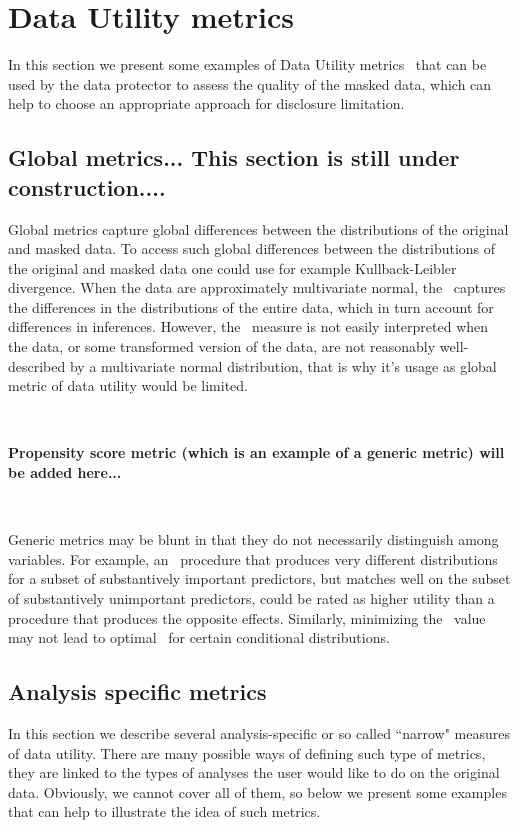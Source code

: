\documentclass[12pt]{article}
\begin{document}
\section{ Data Utility metrics} \label{du_metrics}
In this section we present some examples of Data Utility metrics \DU\ that can be used by the data protector to assess the quality of the masked data, which can help to choose an appropriate approach for disclosure limitation.

\subsection{Global metrics... This section is still under construction.... }


Global metrics capture global differences between the distributions of the original and masked
data. To access such global differences between the distributions of the original and masked 
data one could use for example Kullback-Leibler divergence.  
When the data are approximately multivariate normal, the \KL\
captures the differences in the distributions of the entire data,
which in turn account for differences in inferences. 
However, the \KL\ measure is not easily
interpreted when the data, or some transformed version of the
data, are not reasonably well-described by a multivariate normal
distribution, that is why it's  usage as  global metric of data utility
would be limited.

$ $
 
 {\bf Propensity score metric (which is an example of a generic metric)  will be added here...}

$ $

Generic metrics may be blunt in that they do not necessarily distinguish 
among variables. For example, an \SDL\ procedure that produces very different
distributions for a subset of substantively important predictors,
but matches well on the subset of substantively unimportant
predictors, could be rated as higher utility than a procedure that
produces the opposite effects.  Similarly, minimizing the \KL\
value may not lead to optimal \DBREL\ for certain conditional
distributions.  


\subsection{Analysis specific metrics}
In this section we describe several analysis-specific or so called ``narrow" measures of data utility. There are many possible ways of defining such type of metrics,  they 
are linked to the types of analyses the user would like to do on the original data.
 Obviously, we cannot cover all of them, so below we present some examples 
 that can help to illustrate the idea of such metrics.
\end{document}
